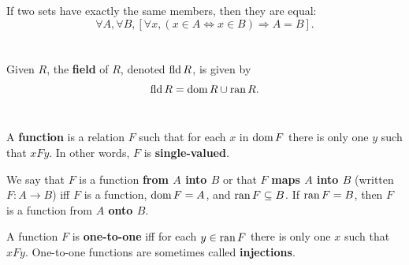 \documentclass{report}
\begin{document}
\begin{definition}


\end{definition}

\section{}%

If two sets have exactly the same members, then they are equal:
  $$\forall A, \forall B,
      \left[\forall x, (x \in A \iff x \in B) \Rightarrow A = B\right].$$

\begin{axiom}


\end{axiom}

\section{}%

Given  $R$, the \textbf{field} of $R$, denoted $\mathop{\text{fld}}{R}$,
  is given by $$\mathop{\text{fld}}{R} = \mathop{\text{dom}}{R} \cup \mathop{\text{ran}}{R}.$$

\begin{definition}


\end{definition}

\section{}%

A \textbf{function} is a relation $F$ such that for each $x$ in $\mathop{\text{dom}}{F}$ there
  is only one $y$ such that $xFy$.
In other words, $F$ is \textbf{single-valued}.

We say that $F$ is a function \textbf{from $A$ into $B$} or that $F$
  \textbf{maps $A$ into $B$} (written $F \colon A \rightarrow B$) iff $F$ is a
  function, $\mathop{\text{dom}}{F} = A$, and $\mathop{\text{ran}}{F} \subseteq B$.
If $\mathop{\text{ran}}{F} = B$, then $F$ is a function from \textbf{$A$ onto $B$}.

A function $F$ is \textbf{one-to-one} iff for each $y \in \mathop{\text{ran}}{F}$ there is only
  one $x$ such that $xFy$.
One-to-one functions are sometimes called \textbf{injections}.
\end{document}
